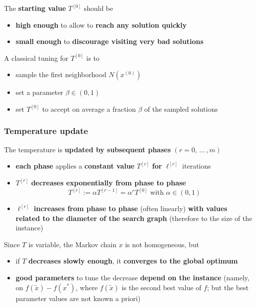 \documentclass[11pt]{article}
\begin{document}
	The \textbf{starting value} $T^{[0]}$ should be
	\begin{itemize}
		\item \textbf{high enough} to allow to \textbf{reach any solution quickly}
		\item \textbf{small enough} to \textbf{discourage visiting very bad solutions}
	\end{itemize}
	
	A classical tuning for $T^{[0]}$ is to
	\begin{itemize}
		\item sample the first neighborhood $N (x^{(0)})$
		\item set a parameter $\beta \in (0, 1)$
		\item set $T^{[0]}$ to accept on average a fraction $\beta$ of the sampled solutions
	\end{itemize}
	
	\newpage
	
	\subsubsection{Temperature update}
	The temperature is \textbf{updated by subsequent phases} $(r = 0, \, ... \, , m)$
	\begin{itemize}
		\item \textbf{each phase} applies a \textbf{constant value} $T^{[r]}$ \textbf{for} $\ell^{[r ]}$ iterations
		
		\item $T^{[r]}$ \textbf{decreases exponentially from phase to phase}
		$$ T^{[r ]} := \alpha T^{[r −1]} = \alpha^r T^{[0]} \text{ with } \alpha \in (0, 1) $$
		
		\item $\ell^{[r ]}$ \textbf{increases from phase to phase} (often linearly) \textbf{with values related to the diameter of the search graph} (therefore to the size of the instance)
	\end{itemize}
	
	Since $T$ is variable, the Markov chain $x$ is not homogeneous, but
	\begin{itemize}
		\item if $T$ \textbf{decreases slowly enough}, it \textbf{converges to the global optimum}
		
		\item \textbf{good parameters} to tune the decrease \textbf{depend on the instance} (namely, on $f (\tilde{x}) - f (x^\ast)$, where $f (\tilde{x})$ is the second best value of $f$; but the best parameter values are not known a priori)
	\end{itemize}
	
\end{document}

